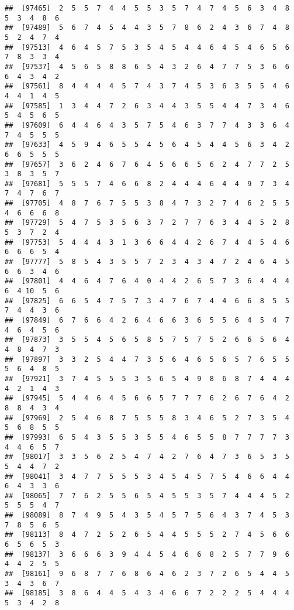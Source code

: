 \documentclass[
]{book}
\begin{document}
\begin{verbatim}
##  [97465]  2  5  5  7  4  4  5  5  3  5  7  4  7  4  5  6  3  4  8  5  3  4  8  6
##  [97489]  5  6  7  4  5  4  4  3  5  7  8  6  2  4  3  6  7  4  8  5  2  4  7  4
##  [97513]  4  6  4  5  7  5  3  5  4  5  4  4  6  4  5  4  6  5  6  7  8  3  3  4
##  [97537]  4  5  6  5  8  8  6  5  4  3  2  6  4  7  7  5  3  6  6  6  4  3  4  2
##  [97561]  8  4  4  4  4  5  7  4  3  7  4  5  3  6  3  5  5  4  6  4  4  1  4  5
##  [97585]  1  3  4  4  7  2  6  3  4  4  3  5  5  4  4  7  3  4  6  5  4  5  6  5
##  [97609]  6  4  4  6  4  3  5  7  5  4  6  3  7  7  4  3  3  6  4  7  4  5  5  5
##  [97633]  4  5  9  4  6  5  5  4  5  6  4  5  4  4  5  6  3  4  2  6  6  5  5  5
##  [97657]  3  6  2  4  6  7  6  4  5  6  6  5  6  2  4  7  7  2  5  3  8  3  5  7
##  [97681]  5  5  5  7  4  6  6  8  2  4  4  4  6  4  4  9  7  3  4  7  4  7  6  7
##  [97705]  4  8  7  6  7  5  5  3  8  4  7  3  2  7  4  6  2  5  5  4  6  6  6  8
##  [97729]  5  4  7  5  3  5  6  3  7  2  7  7  6  3  4  4  5  2  8  5  3  7  2  4
##  [97753]  5  4  4  4  3  1  3  6  6  4  4  2  6  7  4  4  5  4  6  6  6  6  5  4
##  [97777]  5  8  5  4  3  5  5  7  2  3  4  3  4  7  2  4  6  4  5  6  6  3  4  6
##  [97801]  4  4  6  4  7  6  4  0  4  4  2  6  5  7  3  6  4  4  4  6  4 10  5  6
##  [97825]  6  6  5  4  7  5  7  3  4  7  6  7  4  4  6  6  8  5  5  7  4  4  3  6
##  [97849]  6  7  6  6  4  2  6  4  6  6  3  6  5  5  6  4  5  4  7  4  6  4  5  6
##  [97873]  3  5  5  4  5  6  5  8  5  7  5  7  5  2  6  6  5  6  4  4  8  4  7  3
##  [97897]  3  3  2  5  4  4  7  3  5  6  4  6  5  6  5  7  6  5  5  5  6  4  8  5
##  [97921]  3  7  4  5  5  5  3  5  6  5  4  9  8  6  8  7  4  4  4  4  2  1  4  3
##  [97945]  5  4  4  6  4  5  6  6  5  7  7  7  6  2  6  7  6  4  2  8  8  4  3  4
##  [97969]  2  5  4  6  8  7  5  5  5  8  3  4  6  5  2  7  3  5  4  5  6  8  5  5
##  [97993]  6  5  4  3  5  5  3  5  5  4  6  5  5  8  7  7  7  7  3  4  4  6  5  7
##  [98017]  3  3  5  6  2  5  4  7  4  2  7  6  4  7  3  6  5  3  5  5  4  4  7  2
##  [98041]  3  4  7  7  5  5  5  3  4  5  4  5  7  5  4  6  6  4  4  6  4  3  3  6
##  [98065]  7  7  6  2  5  5  6  5  4  5  5  3  5  7  4  4  4  5  2  5  5  5  4  7
##  [98089]  8  7  4  9  5  4  3  5  4  5  7  5  6  4  3  7  4  5  3  7  8  5  6  5
##  [98113]  8  4  7  2  5  2  6  5  4  4  5  5  5  2  7  4  5  6  6  6  5  6  5  3
##  [98137]  3  6  6  6  3  9  4  4  5  4  6  6  8  2  5  7  7  9  6  4  4  2  5  5
##  [98161]  9  6  8  7  7  6  8  6  4  6  2  3  7  2  6  5  4  4  5  3  4  3  6  7
##  [98185]  3  8  6  4  4  5  4  3  4  6  6  7  2  2  2  5  4  4  4  5  3  4  2  8

\end{verbatim}
\end{document}

